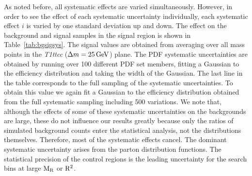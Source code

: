 As noted before, all systematic effects are varied simultaneously. However, in order to see the
effect of each systematic uncertainty individually, each systematic effect $i$ is varied by one
standard deviation up and down.  
The effect on the background and signal samples in the signal region is shown in
Table~\ref{tab:bgsigsys}.  
The signal values are obtained from averaging over all mass points in the {\it T1ttcc} ($\Delta m =
25\,\text{Ge\hspace{-.08em}V}$) plane.  The PDF systematic uncertainties are obtained by running
over 100 different PDF set members, fitting a Gaussian to the efficiency distribution and taking the
width of the Gaussian.  
The last line in the table corresponds to the full sampling of the systematic uncertainties. To
obtain this value we again fit a Gaussian to the efficiency distribution obtained from the full
systematic sampling including 500 variations.  We note  that, although the effects of some of these
systematic uncertainties on the backgrounds are large, these do not influence our results greatly
because only the  ratios of simulated background counts enter the statistical analysis, not the
distributions themselves.  Therefore, most of the systematic effects cancel.  The dominant
systematic uncertainty arises from the parton distribution functions. The statistical precision of
the control regions is the leading uncertainty for the search bins at large $\mathrm{M_R}$ or $\mathrm{R^2}$.

 


% 
% 

